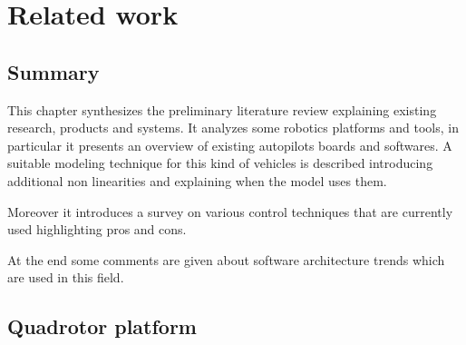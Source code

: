 

\chapter{Related work}
\label{chap:second}
\ifpdf
    \graphicspath{{Chapter2/Figures/PNG/}{Chapter2/Figures/PDF/}{Chapter2/Figures/}}
\else
    \graphicspath{{Chapter2/Figures/EPS/}{Chapter2/Figures/}}
\fi

\section*{Summary}
This chapter synthesizes the preliminary literature review explaining existing research, products and systems. It analyzes some robotics platforms and tools, in particular it presents an overview of existing autopilots boards and softwares. A suitable modeling technique for this kind of vehicles is described introducing additional non linearities and explaining when the model uses them.

Moreover it introduces a survey on various control techniques that are currently used highlighting pros and cons.

At the end some comments are given about software architecture trends which are used in this field. 

\section{Quadrotor platform}

